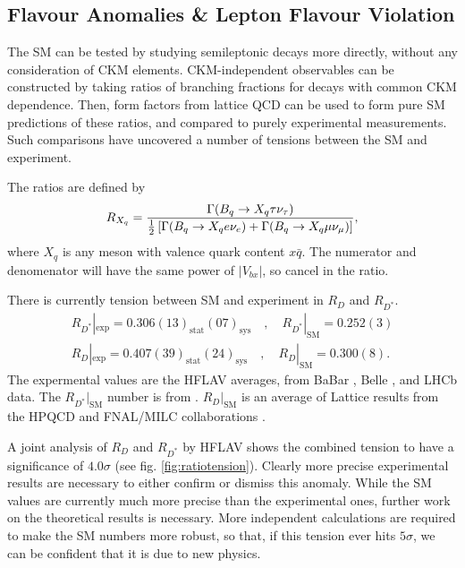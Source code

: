 \subsection{Flavour Anomalies \& Lepton Flavour Violation}

The SM can be tested by studying semileptonic decays more directly, without any consideration of CKM elements. CKM-independent observables can be constructed by taking ratios of branching fractions for decays with common CKM dependence. Then, form factors from lattice QCD can be used to form pure SM predictions of these ratios, and compared to purely experimental measurements. Such comparisons have uncovered a number of tensions between the SM and experiment.

The ratios are defined by
\begin{align}
  R_{X_q} = {\Gamma(B_q\to X_q \tau \nu_{\tau}) \over {1\over 2}\left[\Gamma(B_q\to X_q e \nu_e) + \Gamma(B_q\to X_q \mu \nu_{\mu}) \right]},
\end{align}
where $X_q$ is any meson with valence quark content $x\bar{q}$. The numerator and denomenator will have the same power of $|V_{bx}|$, so cancel in the ratio.

There is currently tension between SM and experiment in $R_D$ and $R_{D^*}$.
\begin{gather}
  R_{D^*}|_{\text{exp}} = 0.306(13)_{\text{stat}}(07)_{\text{sys}}\quad,\quad R_{D^*}|_{\text{SM}} = 0.252(3)
  \\
  R_D|_{\text{exp}} = 0.407(39)_{\text{stat}}(24)_{\text{sys}}\quad,\quad R_D|_{\text{SM}} = 0.300(8).
\end{gather}
The expermental values are the HFLAV averages, from BaBar \cite{Lees:2012xj,Lees:2013uzd}, Belle \cite{Huschle:2015rga,Sato:2016svk,Hirose:2016wfn,Hirose:2017dxl}, and LHCb \cite{Aaij:2015yra,Aaij:2017uff,Aaij:2017deq} data. The $R_{D^*}|_{\text{SM}}$ number is from \cite{Fajfer:2012vx}. $R_D|_{\text{SM}}$ is an average of Lattice results from the HPQCD \cite{Na:2015kha} and FNAL/MILC collaborations \cite{Lattice:2015rga}.

A joint analysis of $R_D$ and $R_{D^*}$ by HFLAV shows the combined tension to have a significance of $4.0\sigma$ (see fig. \ref{fig:ratiotension}). Clearly more precise experimental results are necessary to either confirm or dismiss this anomaly. While the SM values are currently much more precise than the experimental ones, further work on the theoretical results is necessary. More independent calculations are required to make the SM numbers more robust, so that, if this tension ever hits $5\sigma$, we can be confident that it is due to new physics.

